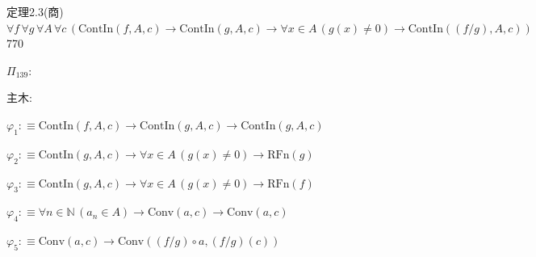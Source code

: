 \begin{fullproof}{定理2.3(商)}{$\forall f\,\forall g\,\forall A\,\forall c\,(\mathrm{ContIn}(f,A,c) \to \mathrm{ContIn}(g,A,c) \to \forall x \in A\,(g(x) \neq 0) \to \mathrm{ContIn}((f / g),A,c))$}{770}
\begin{ptree}
\end{ptree}
\noindent$\Pi_{139}$:
\begin{ptree}
\noLine
{}
\noLine
{}
\noLine
{}
\noLine
{}
\end{ptree}
\noindent 主木:
\begin{ptree}
\noLine
{}
\noLine
{}
\end{ptree}
\begin{abbrevlist}
\item $\varphi_{1} :\equiv \mathrm{ContIn}(f,A,c) \to \mathrm{ContIn}(g,A,c) \to \mathrm{ContIn}(g,A,c)$
\item $\varphi_{2} :\equiv \mathrm{ContIn}(g,A,c) \to \forall x \in A\,(g(x) \neq 0) \to \mathrm{RFn}(g)$
\item $\varphi_{3} :\equiv \mathrm{ContIn}(g,A,c) \to \forall x \in A\,(g(x) \neq 0) \to \mathrm{RFn}(f)$
\item $\varphi_{4} :\equiv \forall n \in \mathbb{N}\,(a_{n} \in A) \to \mathrm{Conv}(a,c) \to \mathrm{Conv}(a,c)$
\item $\varphi_{5} :\equiv \mathrm{Conv}(a,c) \to \mathrm{Conv}((f / g) \circ a,(f / g)(c))$

\end{abbrevlist}
\end{fullproof}
